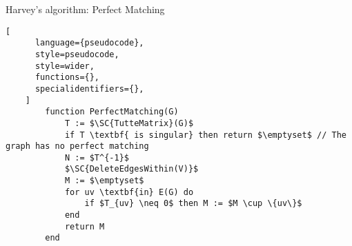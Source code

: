 \begin{programruledcaption}{Harvey's algorithm: Perfect Matching}
    \begin{lstlisting}[
      language={pseudocode},
      style=pseudocode,
      style=wider,
      functions={},
      specialidentifiers={},
    ]
        function PerfectMatching(G)
            T := $\SC{TutteMatrix}(G)$
            if T \textbf{ is singular} then return $\emptyset$ // The graph has no perfect matching
            N := $T^{-1}$
            $\SC{DeleteEdgesWithin(V)}$
            M := $\emptyset$
            for uv \textbf{in} E(G) do
                if $T_{uv} \neq 0$ then M := $M \cup \{uv\}$
            end
            return M
        end
    \end{lstlisting}
\end{programruledcaption}

